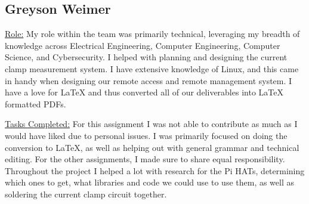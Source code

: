 \subsection{Greyson Weimer}
\underline{Role:} My role within the team was primarily technical, leveraging my breadth of knowledge across Electrical Engineering, Computer Engineering, Computer Science, and Cybersecurity.
I helped with planning and designing the current clamp measurement system.
I have extensive knowledge of Linux, and this came in handy when designing our remote access and remote management system.
I have a love for LaTeX and thus converted all of our deliverables into LaTeX formatted PDFs.

\underline{Tasks Completed:} For this assignment I was not able to contribute as much as I would have liked due to personal issues.
I was primarily focused on doing the conversion to LaTeX, as well as helping out with general grammar and technical editing.
For the other assignments, I made sure to share equal responsibility.
Throughout the project I helped a lot with research for the Pi HATs, determining which ones to get, what libraries and code we could use to use them, as well as soldering the current clamp circuit together.
